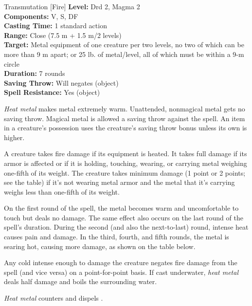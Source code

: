 {Transmutation [Fire]}
{
	\textbf{Level:}
	Drd 2, Magma 2\\
	\textbf{Components:}
	V, S, DF\\
	\textbf{Casting Time:}
	1 standard action\\
	\textbf{Range:}
	Close (7.5 m + 1.5 m/2 levels)\\
	\textbf{Target:}
	Metal equipment of one creature per two levels, no two of which can be more than 9 m apart; or 25 lb. of metal/level, all of which must be within a 9-m circle\\
	\textbf{Duration:}
	7 rounds\\
	\textbf{Saving Throw:}
	Will negates (object)\\
	\textbf{Spell Resistance:}
	Yes (object)\\
}
{
	\emph{Heat metal} makes metal extremely warm. Unattended, nonmagical metal gets no saving throw. Magical metal is allowed a saving throw against the spell. An item in a creature's possession uses the creature's saving throw bonus unless its own is higher.

	A creature takes fire damage if its equipment is heated. It takes full damage if its armor is affected or if it is holding, touching, wearing, or carrying metal weighing one-fifth of its weight. The creature takes minimum damage (1 point or 2 points; see the table) if it's not wearing metal armor and the metal that it's carrying weighs less than one-fifth of its weight.


	On the first round of the spell, the metal becomes warm and uncomfortable to touch but deals no damage. The same effect also occurs on the last round of the spell's duration. During the second (and also the next-to-last) round, intense heat causes pain and damage. In the third, fourth, and fifth rounds, the metal is searing hot, causing more damage, as shown on the table below.

	Any cold intense enough to damage the creature negates fire damage from the spell (and vice versa) on a point-for-point basis. If cast underwater, \emph{heat metal} deals half damage and boils the surrounding water.

	\emph{Heat metal} counters and dispels .

}
